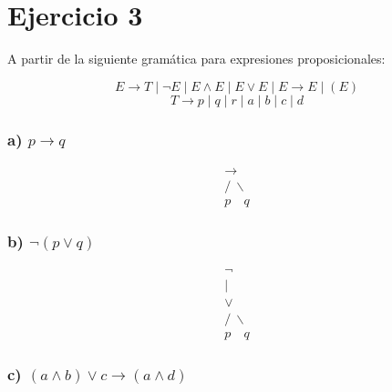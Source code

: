 \chapter*{Ejercicio 3}

A partir de la siguiente gramática para expresiones proposicionales:

\[
E \to T \mid \neg E \mid E \land E \mid E \lor E \mid E \to E \mid (E)
\]
\[
T \to p \mid q \mid r \mid a \mid b \mid c \mid d
\]

\subsection*{a) $p \to q$}

\vspace*{\fill}
\begin{center}
\[
\begin{array}{c}
     \rightarrow \\
    / \ \backslash \\
   p   \quad  q 
\end{array}
\]
\end{center}
\vspace*{\fill}

\subsection*{b) $\neg(p \lor q)$}

\vspace*{\fill}
\begin{center}
\[
\begin{array}{c}
      \neg \\
      | \\
      \lor \\
     / \ \backslash \\
    p   \quad  q 
\end{array}
\]
\end{center}
\vspace*{\fill}

\subsection*{c) $(a \land b) \lor c \to (a \land d)$}

